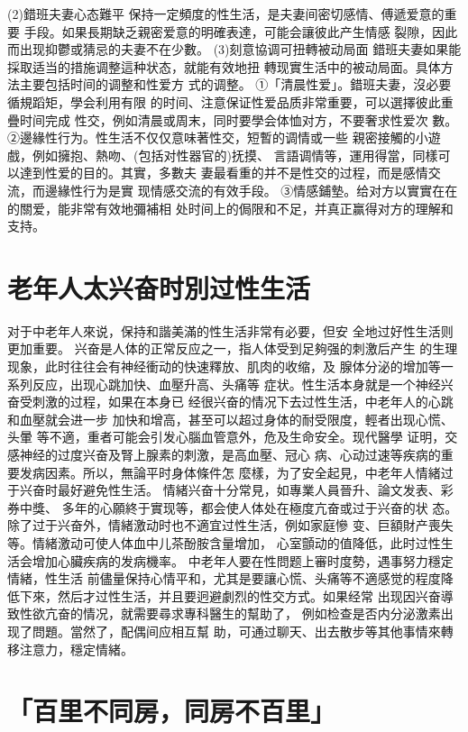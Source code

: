 \documentclass[12pt,UTF8]{ctexbook}
\begin{document}
(2)錯班夫妻心态難平
保持一定頻度的性生活，是夫妻间密切感情、傅遞爱意的重要
手段。如果長期缺乏親密爱意的明確表達，可能会讓彼此产生情感
裂隙，因此而出现抑鬱或猜忌的夫妻不在少數。
(3)刻意協调可扭轉被动局面
錯班夫妻如果能採取适当的措施调整這种状态，就能有效地扭
轉现實生活中的被动局面。具体方法主要包括时间的调整和性爱方
式的调整。
①「清晨性爱」。錯班夫妻，沒必要循規蹈矩，學会利用有限
的时间、注意保证性爱品质非常重要，可以選擇彼此重疊时间完成
性交，例如清晨或周末，同时要學会体恤对方，不要奢求性爱次
數。
②邊緣性行为。性生活不仅仅意味著性交，短暫的调情或一些
親密接觸的小遊戲，例如擁抱、熱吻、(包括对性器官的)抚摸、
言語调情等，運用得當，同樣可以達到性爱的目的。其實，多數夫
妻最看重的并不是性交的过程，而是感情交流，而邊緣性行为是實
现情感交流的有效手段。
③情感鋪墊。给对方以實實在在的關爱，能非常有效地彌補相
处时间上的侷限和不足，并真正赢得对方的理解和支持。


\section{老年人太兴奋时別过性生活}

对于中老年人來说，保持和諧美滿的性生活非常有必要，但安
全地过好性生活则更加重要。
兴奋是人体的正常反应之一，指人体受到足夠强的刺激后产生
的生理现象，此时往往会有神经衝动的快速釋放、肌肉的收缩，及
腺体分泌的增加等一系列反应，出现心跳加快、血壓升高、头痛等
症状。性生活本身就是一个神经兴奋受刺激的过程，如果在本身已
经很兴奋的情况下去过性生活，中老年人的心跳和血壓就会进一步
加快和增高，甚至可以超过身体的耐受限度，輕者出现心慌、头暈
等不適，重者可能会引发心腦血管意外，危及生命安全。现代醫學
证明，交感神经的过度兴奋及腎上腺素的刺激，是高血壓、冠心
病、心动过速等疾病的重要发病因素。所以，無論平时身体條件怎
麼樣，为了安全起見，中老年人情緒过于兴奋时最好避免性生活。
情緒兴奋十分常見，如專業人員晉升、論文发表、彩券中獎、
多年的心願終于實现等，都会使人体处在極度亢奋或过于兴奋的状
态。除了过于兴奋外，情緒激动时也不適宜过性生活，例如家庭慘
变、巨額財产喪失等。情緒激动可使人体血中儿茶酚胺含量增加，
心室顫动的值降低，此时过性生活会增加心臟疾病的发病機率。
中老年人要在性問题上審时度勢，遇事努力穩定情緒，性生活
前儘量保持心情平和，尤其是要讓心慌、头痛等不適感觉的程度降
低下來，然后才过性生活，并且要迥避劇烈的性交方式。如果经常
出现因兴奋導致性欲亢奋的情况，就需要尋求專科醫生的幫助了，
例如检查是否内分泌激素出现了問題。當然了，配偶间应相互幫
助，可通过聊天、出去散步等其他事情來轉移注意力，穩定情緒。

\section{「百里不同房，同房不百里」}
\end{document}
